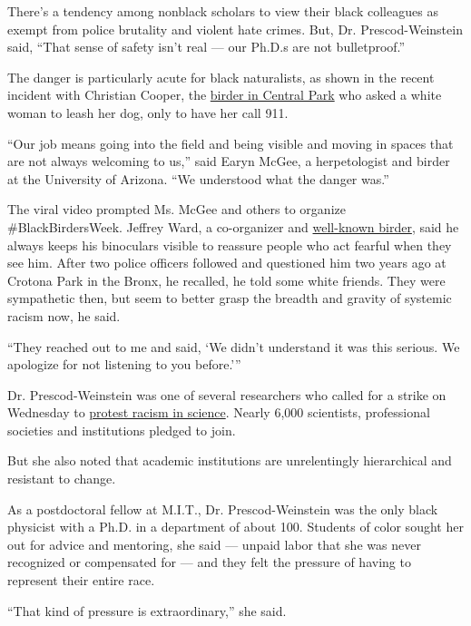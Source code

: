 There's a tendency among nonblack scholars to view their black
colleagues as exempt from police brutality and violent hate crimes. But,
Dr. Prescod-Weinstein said, ``That sense of safety isn't real --- our
Ph.D.s are not bulletproof.''

The danger is particularly acute for black naturalists, as shown in the
recent incident with Christian Cooper, the
\href{https://www.nytimes.com/2020/05/27/nyregion/amy-cooper-christian-central-park-video.html}{birder
in Central Park} who asked a white woman to leash her dog, only to have
her call 911.

``Our job means going into the field and being visible and moving in
spaces that are not always welcoming to us,'' said Earyn McGee, a
herpetologist and birder at the University of Arizona. ``We understood
what the danger was.''

The viral video prompted Ms. McGee and others to organize
\#BlackBirdersWeek. Jeffrey Ward, a co-organizer and
\href{https://www.nytimes.com/2019/06/28/movies/birding-people-of-color-rolling-stone.html}{well-known
birder}, said he always keeps his binoculars visible to reassure people
who act fearful when they see him. After two police officers followed
and questioned him two years ago at Crotona Park in the Bronx, he
recalled, he told some white friends. They were sympathetic then, but
seem to better grasp the breadth and gravity of systemic racism now, he
said.

``They reached out to me and said, `We didn't understand it was this
serious. We apologize for not listening to you before.'''

Dr. Prescod-Weinstein was one of several researchers who called for a
strike on Wednesday to
\href{https://www.nytimes.com/2020/06/10/science/science-diversity-racism-protests.html}{protest
racism in science}. Nearly 6,000 scientists, professional societies and
institutions pledged to join.

But she also noted that academic institutions are unrelentingly
hierarchical and resistant to change.

As a postdoctoral fellow at M.I.T., Dr. Prescod-Weinstein was the only
black physicist with a Ph.D. in a department of about 100. Students of
color sought her out for advice and mentoring, she said --- unpaid labor
that she was never recognized or compensated for --- and they felt the
pressure of having to represent their entire race.

``That kind of pressure is extraordinary,'' she said.

